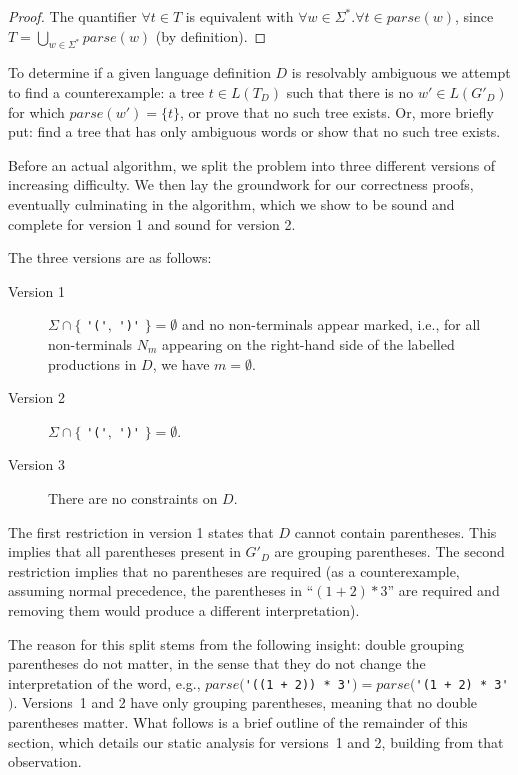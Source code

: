 \documentclass[acmsmall,review,anonymous]{acmart}\settopmatter{printfolios=true,printccs=false,printacmref=false}
\newcommand{\T}{\Sigma} %
\newcommand{\parse}{\mathit{parse}} %
\begin{document}
\begin{proof}
  The quantifier $\forall t \in T$ is equivalent with $\forall w \in \T^{*}. \forall t \in \parse(w)$, since $T = \bigcup_{w \in \T^{*}} \parse(w)$ (by definition).
\end{proof}

\noindent To determine if a given language definition $D$ is resolvably ambiguous we attempt to find a counterexample: a tree $t \in L(T_D)$ such that there is no $w' \in L(G'_D)$ for which $\parse(w') = \{t\}$, or prove that no such tree exists. Or, more briefly put: find a tree that has only ambiguous words or show that no such tree exists.

Before an actual algorithm, we split the problem into three different versions of increasing difficulty. We then lay the groundwork for our correctness proofs, eventually culminating in the algorithm, which we show to be sound and complete for version 1 and sound for version 2.

The three versions are as follows:

\begin{description}
\item[Version 1] $\T \cap \{$ \verb|'('|$,$ \verb|')'| $\} = \emptyset$ and no non-terminals appear marked, i.e., for all non-terminals $N_m$ appearing on the right-hand side of the labelled productions in $D$, we have $m = \emptyset$.
\item[Version 2] $\T \cap \{$ \verb|'('|$,$ \verb|')'| $\} = \emptyset$.
\item[Version 3] There are no constraints on $D$.
\end{description}

\noindent The first restriction in version 1 states that $D$ cannot contain parentheses. This implies that all parentheses present in $G'_D$ are grouping parentheses. The second restriction implies that no parentheses are required (as a counterexample, assuming normal precedence, the parentheses in ``$(1 + 2) * 3$'' are required and removing them would produce a different interpretation).

The reason for this split stems from the following insight: double grouping parentheses do not matter, in the sense that they do not change the interpretation of the word, e.g., $\parse($\verb|'((1 + 2)) * 3'|$) = \parse($\verb|'(1 + 2) * 3'|$)$. Versions~1 and 2 have only grouping parentheses, meaning that no double parentheses matter. What follows is a brief outline of the remainder of this section, which details our static analysis for versions~1 and 2, building from that observation.
\end{document}
